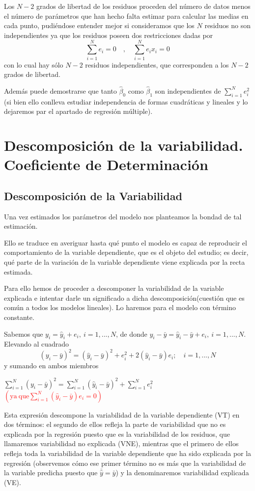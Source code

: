 \documentclass[10pt,a4paper]{book}
\begin{document}
Los $N-2$ grados de libertad de los residuos proceden del número de datos menos el número de parámetros que han hecho falta estimar para calcular las medias en cada punto, pudiéndose entender mejor si consideramos que los $N$ residuos no son independientes ya que los residuos poseen dos restricciones dadas por $$\sum^N_{i=1}e_i=0\quad ,\quad \sum^N_{i=1}e_ix_i=0$$ con lo cual hay sólo $N-2$ residuos independientes, que corresponden a los $N-2$ grados de libertad.

Además puede demostrarse que tanto $\widehat{\beta}_0$ como $\widehat{\beta}_1$ son independientes de $\displaystyle\sum^N_{i=1}e^2_i$ (si bien ello conlleva estudiar independencia de formas cuadráticas y lineales y lo dejaremos par el apartado de regresión múltiple).
	\section{Descomposición de la variabilidad. Coeficiente de Determinación}
		\subsection{Descomposición de la Variabilidad}
Una vez estimados los parámetros del modelo nos planteamos la bondad de tal estimación.

Ello se traduce en averiguar hasta qué punto el modelo es capaz de reproducir el comportamiento de la variable dependiente, que es el objeto del estudio; es decir, qué parte de la variación de la variable dependiente viene explicada por la recta estimada.

Para ello hemos de proceder a descomponer la variabilidad de la variable explicada e intentar darle un significado a dicha descomposición(cuestión que es común a todos los modelos lineales). Lo haremos para el modelo con término constante.

Sabemos que $y_i=\widehat{y}_i+e_i,\ i=1,...,N$, de donde $y_i-\bar{y}=\widehat{y}_i-\bar{y}+e_i,\ i=1,...,N$. Elevando al cuadrado $$(y_i-\bar{y})^2=(\widehat{y}_i-\bar{y})^2+e_i^2+2(\widehat{y}_i-\bar{y})e_i;\quad i=1,...,N$$ y sumando en ambos miembros 
\begin{center}
$\displaystyle\sum^N_{i=1}(y_i-\bar{y})^2=\displaystyle\sum^N_{i=1}(\widehat{y}_i-\bar{y})^2+\displaystyle\sum^N_{i=1}e_i^2\qquad$ \textcolor{red}{$\left(\mathrm{ya\ que} \displaystyle\sum^N_{i=1}(\widehat{y}_i-\bar{y})e_i=0 \right)$}
\end{center}

Esta expresión descompone la variabilidad de la variable dependiente (VT) en dos términos: el segundo de ellos refleja la parte de variabilidad que no es explicada por la regresión puesto que es la variabilidad de los residuos, que llamaremos variabilidad no explicada (VNE), mientras que el primero de ellos
refleja toda la variabilidad de la variable dependiente que ha sido explicada por la regresión (observemos cómo ese primer término no es más que la variabilidad de la variable predicha puesto que $\bar{\widehat{y}}=\bar{y}$) y la denominaremos variabilidad explicada (VE).
\ \\
\end{document}
